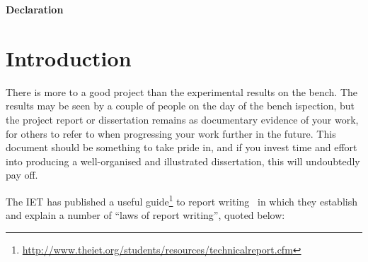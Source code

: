 \documentclass[12pt, a4paper]{report}
\begin{document}
\newpage

\rule{0mm}{30mm}

\centerline{\textbf{Declaration}}




\newpage \tableofcontents
\newpage \listoffigures
\newpage \listoftables 
\newpage \lstlistoflistings        %

\newpage \onehalfspace

\chapter{Introduction}

There is more to a good project than the experimental results on the bench. The results may be seen by a couple of people on the day of the bench ispection, but the project report or dissertation remains as documentary evidence of your work, for others to refer to when progressing your work further in the future. This document should be something to take pride in, and if you invest time and effort into producing a well-organised and illustrated dissertation, this will undoubtedly pay off. 

The IET has published a useful guide\footnote{\url{http://www.theiet.org/students/resources/technicalreport.cfm}} to report writing~\cite{ref:IET} in which they establish and explain a number of ``laws of report writing'', quoted below: 
\end{document}
